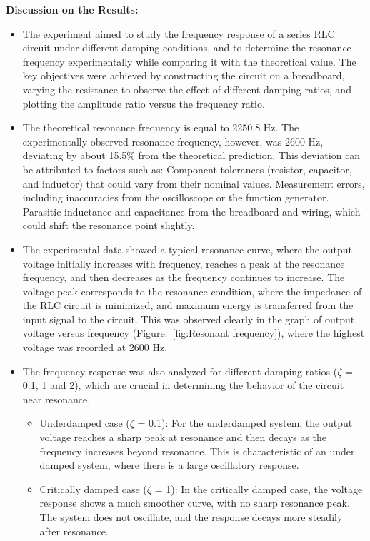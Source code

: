 \documentclass[11pt]{scrreprt}
\begin{document}
\noindent\textbf{Discussion on the Results:}
\begin{itemize}
\item The experiment aimed to study the frequency response of a series RLC circuit under different damping conditions, and to determine the resonance frequency experimentally while comparing it with the theoretical value. The key objectives were achieved by constructing the circuit on a breadboard, varying the resistance to observe the effect of different damping ratios, and plotting the amplitude ratio versus the frequency ratio.
\item The theoretical resonance frequency is equal to 2250.8 Hz. The experimentally observed resonance frequency, however, was 2600 Hz, deviating by about 15.5\% from the theoretical prediction. This deviation can be attributed to factors such as:
Component tolerances (resistor, capacitor, and inductor) that could vary from their nominal values.
Measurement errors, including inaccuracies from the oscilloscope or the function generator.
Parasitic inductance and capacitance from the breadboard and wiring, which could shift the resonance point slightly.

\item The experimental data showed a typical resonance curve, where the output voltage initially increases with frequency, reaches a peak at the resonance frequency, and then decreases as the frequency continues to increase.
 The voltage peak corresponds to the resonance condition, where the impedance of the RLC circuit is minimized, and maximum energy is transferred from the input signal to the circuit. This was observed clearly in the graph of output voltage versus frequency (Figure.~\ref{fig:Resonant frequency}), where the highest voltage was recorded at 2600 Hz.

\item The frequency response was also analyzed for different damping ratios ($\zeta$ = 0.1, 1 and 2), which are crucial in determining the behavior of the circuit near resonance.
    \begin{itemize}
    \item Underdamped case ($\zeta$ = 0.1): For the underdamped system, the output voltage reaches a sharp peak at resonance and then decays as the frequency increases beyond resonance. This is characteristic of an under damped system, where there is a large oscillatory response.

    \item Critically damped case ($\zeta$ = 1): In the critically damped case, the voltage response shows a much smoother curve, with no sharp resonance peak. The system does not oscillate, and the response decays more steadily after resonance.


\end{itemize}
\end{itemize}
\end{document}

